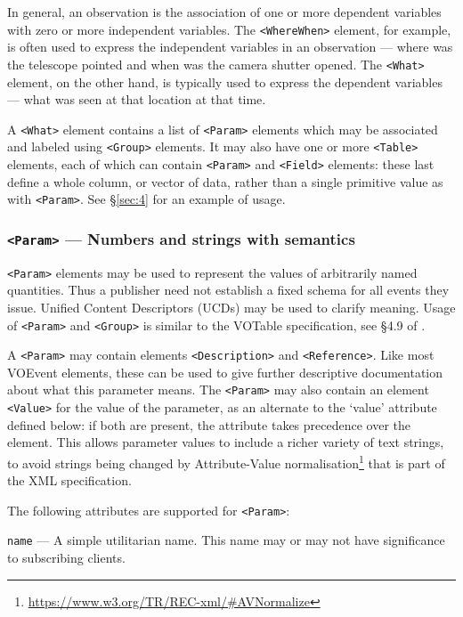 \documentclass[11pt,a4paper]{ivoa}
\begin{document}
In general, an observation is the association of one or more dependent variables
with zero or more independent variables. The {\tt <WhereWhen>} element, for
example, is often used to express the independent variables in an observation
--- where was the telescope pointed and when was the camera shutter opened. The
{\tt <What>} element, on the other hand, is typically used to express the
dependent variables --- what was seen at that location at that time.

A {\tt <What>} element contains a list of {\tt <Param>} elements which may be
associated and labeled using {\tt <Group>} elements. It may also have one or
more \texttt{<Table>} elements, each of which can contain {\tt <Param>} and {\tt <Field>}
elements: these last define a whole column, or vector of data, rather than a
single primitive value as with \texttt{<Param>}. See \S\ref{sec:4} for an example of
usage.

\subsubsection{{\tt <Param>} --- Numbers and strings with semantics}
\label{sec:3.3.1}
{\tt <Param>} elements may be used to represent the values of arbitrarily named
quantities. Thus a publisher need not establish a fixed schema for all events
they issue. Unified Content Descriptors (UCDs) \citep{2018ivoa.spec.0527P}
may be used to clarify meaning. Usage of {\tt <Param>} and {\tt <Group>} is
similar to the VOTable specification, see \S4.9 of \citep{2019ivoa.spec.1021O}.

A {\tt <Param>} may contain elements {\tt <Description>} and {\tt <Reference>}.
Like most VOEvent elements, these can be used to give further descriptive
documentation about what this parameter means. The {\tt <Param>} may also
contain an element {\tt <Value>} for the value of the parameter, as an alternate
to the `value' attribute defined below: if both are present, the attribute takes
precedence over the element. This allows parameter values to include a richer
variety of text strings, to avoid strings being changed by Attribute-Value
normalisation\footnote{\url{https://www.w3.org/TR/REC-xml/\#AVNormalize}} that
is part of the XML specification.

The following attributes are supported for {\tt <Param>}:

 {\tt name}\label{sec:3.3.1.1} --- A simple utilitarian
name. This name may or may not have significance to subscribing clients.
\end{document}

